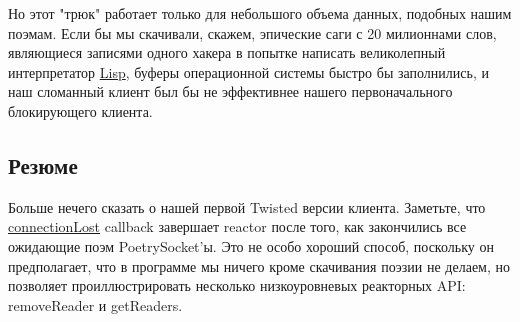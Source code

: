 

Но этот "трюк" работает только для небольшого объема данных, 
подобных нашим поэмам. Если бы мы скачивали, скажем, эпические 
саги с 20 милионнами слов, являющиеся записями одного 
хакера в попытке написать великолепный интерпретатор
\href{http://en.wikipedia.org/wiki/Lisp\_(programming\_language)}{Lisp}, 
буферы операционной системы быстро бы заполнились, и наш 
сломанный клиент был бы не эффективнее нашего первоначального 
блокирующего клиента.

\subsection{Резюме}



Больше нечего сказать о нашей первой Twisted версии клиента. 
Заметьте, что 
\href{http://github.com/jdavisp3/twisted-intro/blob/master/twisted-client-1/get-poetry.py#L74}{connectionLost} 
callback завершает reactor после того, как закончились все 
ожидающие поэм PoetrySocket'ы. Это не особо хороший способ, 
поскольку он предполагает, что в программе мы ничего кроме 
скачивания поэзии не делаем, но позволяет проиллюстрировать 
несколько низкоуровневых реакторных API: removeReader и getReaders.



